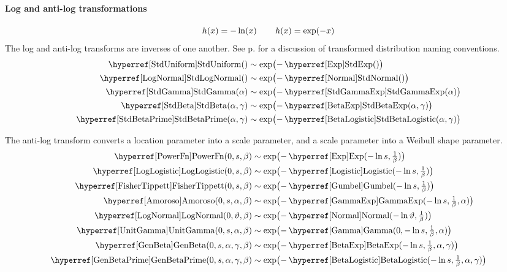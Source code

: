 \paragraph*{Log and anti-log transformations}
\label{logtransform}
\[
h(x) = - \ln(x) \, \qquad
h(x) = \exp(-x)
\notag
\checked
\]
The log and anti-log transforms are inverses of one another. See p.\pageref{log-transform-name} for a discussion of transformed distribution naming conventions.
\begin{align*}
\opr{StdUniform}() &\sim \exp\bigl(-\oprr{StdExp}{Exp}()\bigr) \checked
\\
\oprr{StdLogNormal}{LogNormal}() &\sim \exp\bigl(-\oprr{StdNormal}{Normal}()\bigr) \checked
\\
\opr{StdGamma}(\alpha) &\sim \exp\bigl(-\opr{StdGammaExp}(\alpha)\bigr)  \checked
\\
\opr{StdBeta}(\alpha,\gamma) & \sim \exp\bigl(-\oprr{StdBetaExp}{BetaExp}(\alpha,\gamma)\bigr)  \checked
\\
 \opr{StdBetaPrime}(\alpha,\gamma) & \sim \exp\bigl(-\oprr{StdBetaLogistic}{BetaLogistic}(\alpha,\gamma)\bigr)  \checked
\end{align*}

The anti-log transform converts a location parameter into a scale parameter, and a scale parameter into a Weibull shape parameter. 
\begin{align*}
\opr{PowerFn}(0,s,\beta) &\sim  \exp\bigl(-\opr{Exp}(-\ln s ,\sfrac{1}{\beta} )\bigr) 
\checked
\\
\opr{LogLogistic}(0,s,\beta) &\sim  \exp\bigl(-\opr{Logistic}(-\ln s,\sfrac{1}{\beta})\bigr) 
\checked
\\
\opr{FisherTippett}(0,s,\beta) & \sim \exp\bigl(-\opr{Gumbel}(-\ln s,\sfrac{1}{\beta})\bigr) 
\checked
\\
\opr{Amoroso}(0,s, \alpha,\beta) &\sim \exp\bigl(-\opr{GammaExp}(-\ln s, \sfrac{1}{\beta}, \alpha)\bigr) 
\checked
\\
\opr{LogNormal}(0,\vartheta,\beta) &\sim \exp\bigl(-\opr{Normal}(-\ln \vartheta,\sfrac{1}{\beta})\bigr)  
\checked
 \\ 
 \opr{UnitGamma}(0,s, \alpha, \beta) &\sim \exp\bigl(- \opr{Gamma}(0, -\ln s,\sfrac{1}{\beta}, \alpha)\bigr) 
 \checked
\\
\opr{GenBeta}(0,s,\alpha,\gamma,\beta) & \sim \exp\bigl(-\opr{BetaExp}(-\ln s,\sfrac{1}{\beta},\alpha,\gamma)\bigr) 
\checked
\\
 \opr{GenBetaPrime}(0,s,\alpha,\gamma,\beta) & \sim \exp\bigl(-\opr{BetaLogistic}(-\ln s, \sfrac{1}{\beta}, \alpha,\gamma)\bigr) 
\checked
\end{align*}



